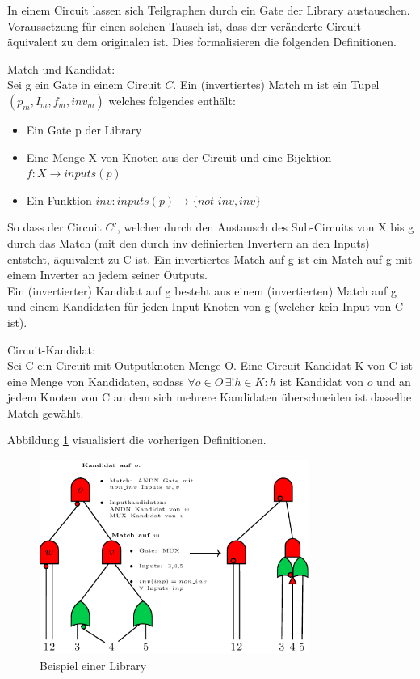 \documentclass[11pt, a4paper, german]{article}
\begin{document}
In einem Circuit lassen sich Teilgraphen durch ein Gate der Library austauschen. Voraussetzung für einen solchen Tausch ist, dass der veränderte Circuit äquivalent zu dem originalen ist. Dies formalisieren die folgenden Definitionen. 

\begin{definition}{Match und Kandidat:}\\
Sei g ein Gate in einem Circuit $C$. Ein (invertiertes) Match m ist ein Tupel $(p_m, I_m, f_m, inv_m)$ welches folgendes enthält:
\begin{itemize}
\item Ein Gate p der Library
\item Eine Menge X von Knoten aus der Circuit und eine Bijektion $ f: X \rightarrow inputs(p)$
\item Ein Funktion $ inv : inputs(p) \rightarrow \{not\_inv , inv \}$
\end{itemize}
So dass der Circuit $C'$, welcher durch den Austausch des Sub-Circuits von X bis g durch das Match (mit den durch inv definierten Invertern an den Inputs) entsteht, äquivalent zu C ist.
Ein invertiertes Match auf g ist ein Match auf g mit einem Inverter an jedem seiner Outputs.\\
Ein (invertierter) Kandidat auf g besteht aus einem (invertierten) Match auf g und einem Kandidaten für jeden Input Knoten von g (welcher kein Input von C ist).
\end{definition}

\begin{definition}{Circuit-Kandidat:}\\
Sei C ein Circuit mit Outputknoten Menge O. Eine Circuit-Kandidat K von C ist eine Menge von Kandidaten, sodass $\forall o \in O \, \exists!  h  \in K : h$ ist Kandidat von $ o$ und an jedem Knoten von C an dem sich mehrere Kandidaten überschneiden ist dasselbe Match gewählt.
\end{definition}
Abbildung \ref{bild:grundl_definitionen} visualisiert die vorherigen Definitionen.\\
\newpage
\begin{figure}[h]
\begin{center}
 \includegraphics[width = 250pt]{./pictures/compiled/grundl_def_veransch.pdf}
 \caption{Beispiel einer Library}
 \label{bild:grundl_definitionen}
\end{center}
\end{figure}
\end{document}
